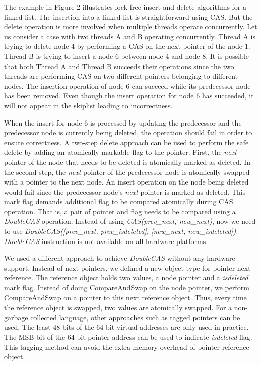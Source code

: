 \documentclass{vldb}
\begin{document}
The example in Figure 2 illustrates lock-free insert and delete algorithms for a linked list. The insertion into a linked list is straightforward using CAS. But the delete operation is more involved when multiple threads operate concurrently. Let us consider a case with two threads A and B operating concurrently. Thread A is trying to delete node 4 by performing a CAS on the next pointer of the node 1. Thread B is trying to insert a node 6 between node 4 and node 8. It is possible that both Thread A and Thread B succeeds their operations since the two threads are performing CAS on two different pointers belonging to different nodes. The insertion operation of node 6 can succeed while its predecessor node has been removed. Even though the insert operation for node 6 has succeeded, it will not appear in the skiplist leading to incorrectness.

When the insert for node 6 is processed by updating the predecessor and the predecessor node is currently being deleted, the operation should fail in order to ensure correctness. A two-step delete approach can be used to perform the safe delete by adding an atomically markable flag to the pointer. First, the \textit{next} pointer of the node that needs to be deleted is atomically marked as deleted. In the second step, the \textit{next} pointer of the predecessor node is atomically swapped with a pointer to the next node. An insert operation on the node being deleted would fail since the predecessor node's \textit{next} pointer is marked as deleted. This mark flag demands additional flag to be compared atomically during CAS operation. That is, a pair of pointer and flag needs to be compared using a \textit{DoubleCAS} operation. Instead of using \textit{CAS(prev\_next, new\_next)}, now we need to use \textit{DoubleCAS([prev\_next, prev\_isdeleted], [new\_next, new\_isdeleted])}. \textit{DoubleCAS} instruction is not available on all hardware platforms.

We used a different approach to achieve \textit{DoubleCAS} without any hardware support. Instead of next pointers, we defined a new object type for pointer next reference. The reference object holds two values, a node pointer and a \textit{isdeleted} mark flag. Instead of doing CompareAndSwap on the node pointer, we perform CompareAndSwap on a pointer to this next reference object. Thus, every time the reference object is swapped, two values are atomically swapped. For a non-garbage collected language, other approaches such as tagged pointers can be used. The least 48 bits of the 64-bit virtual addresses are only used in practice. The MSB bit of the 64-bit pointer address can be used to indicate \textit{isdeleted} flag. This tagging method can avoid the extra memory overhead of pointer reference object.
\end{document}
